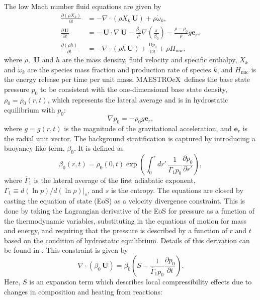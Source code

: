 \documentclass[a4paper]{jpconf}
\newcommand{\maestroex}{{\sffamily MAESTROeX}}
\newcommand{\Ub}{{\,\bm{U}}}
\newcommand{\pd}[2]{\frac{\partial #1}{\partial #2}}
\newcommand{\md}[2]{\frac{\mathrm{D} #1}{\mathrm{D} #2}}
\begin{document}
The low Mach number fluid equations are given by 
\begin{align}
    \pd{\left(\rho X_k\right)}{t} &= - \nabla\cdot\left(\rho X_k \Ub \right) + \rho\dot{\omega}_k, \\
    \pd{\Ub}{t} &= - \Ub\cdot\nabla\Ub - \frac{\beta_0}{\rho}\nabla\left(\frac{\pi}{\beta_0}\right) - \frac{\rho - \rho_0}{\rho} g \bm{e}_r,\\
    \pd{\left(\rho h\right)}{t} &= -\nabla\cdot\left(\rho h \Ub\right) + \md{p_0}{t} + \rho H_{\mathrm{nuc}},
\end{align}
where $\rho$, $\Ub$ and $h$ are the mass density, fluid velocity and specific enthalpy, $X_k$ and $\dot{\omega}_k$ are the species mass fraction and production rate of species $k$, and $H_{\mathrm{nuc}}$ is the energy release per time per unit mass. \maestroex~defines the base state pressure $p_0$ to be consistent with the one-dimensional base state density, $\rho_0 = \rho_0(r, t)$, which represents the lateral average and is in hydrostatic equilibrium with $p_0$:
\begin{equation}
    \nabla p_0 = -\rho_0 g \bm{e}_r,
\end{equation}
where $g = g(r,t)$ is the magnitude of the gravitational acceleration, and $\bm{e}_r$ is the radial unit vector. The background stratification is captured by introducing a buoyancy-like term, $\beta_0$. It is defined as 
\begin{equation}
    \beta_0(r,t) = \rho_0(0,t) \exp\left(\int_0^r dr'\, \frac{1}{\overline{\Gamma}_1p_0}\pd{p_0}{r'} \right),
\end{equation}
where $\overline{\Gamma}_1$ is the lateral average of the first adiabatic exponent, $\Gamma_1 \equiv d(\ln p)/d(\ln \rho)|_s$, and $s$ is the entropy. The equations are closed by casting the equation of state (EoS) as a velocity divergence constraint. This is done by taking the Lagrangian derivative of the EoS for pressure as a function of the thermodynamic variables, substituting in the equations of motion for mass and energy, and requiring that the pressure is described by a function of $r$ and $t$ based on the condition of hydrostatic equilibrium. Details of this derivation can be found in \cite{Almgren2006a,Almgren2006b}. This constraint is given by 
\begin{equation}
    \nabla\cdot\left(\beta_0\Ub\right) = \beta_0 \left(S - \frac{1}{\overline{\Gamma}_1 p_0}\pd{p_0}{t} \right).
\end{equation}
Here, $S$ is an expansion term which describes local compressibility effects due to changes in composition and heating from reactions:
\end{document}

